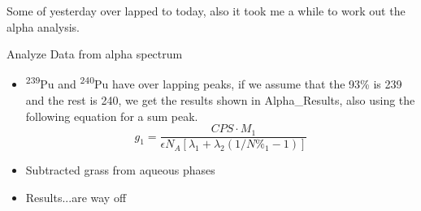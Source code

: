 \documentclass[idxtotoc,hyperref,openany,oneside]{labbook} %
\newcommand{\cmark}{\ding{51}}%
\newcommand{\done}{\rlap{$\square$}{\raisebox{2pt}{\large\hspace{1pt}\cmark}}%
  \hspace{-2.5pt}}
\newcommand{\tss}{\textsuperscript}
\begin{document}


Some of yesterday over lapped to today, also it took
me a while to work out the alpha analysis.

\begin{todolist}
\item[\done]{Analyze Data from alpha spectrum}
  \begin{itemize}
  \item{\tss{239}Pu and \tss{240}Pu have over lapping peaks,
    if we assume that the 93\% is 239 and the rest is 240,
    we get the results shown in Alpha\_Results, also using the
    following equation for a sum peak.}
    \begin{equation*}
      g_1=\frac{CPS\cdot M_1}{\epsilon N_A[\lambda_1+\lambda_2(1/N\%_1-1)]}
    \end{equation*}
  \item{Subtracted grass from aqueous phases}
  \item{Results...are way off}
  \end{itemize}
\end{todolist}



\end{document}
